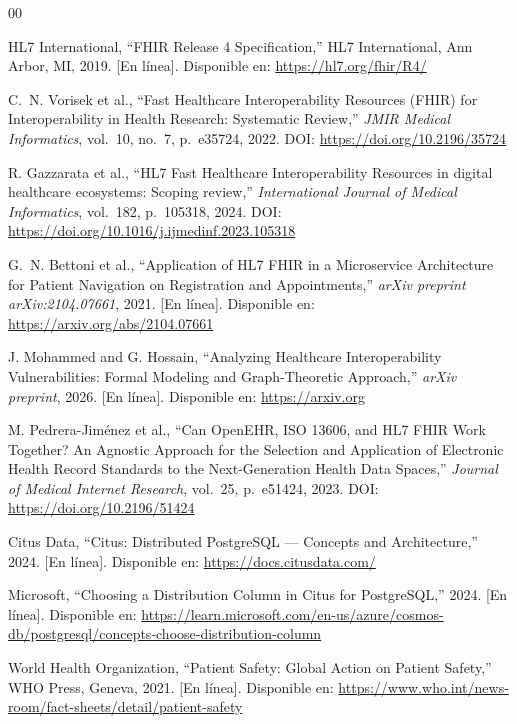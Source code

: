 \documentclass[conference]{IEEEtran}
\begin{document}
\begin{thebibliography}{00}

HL7 International,
``FHIR Release 4 Specification,''
HL7 International, Ann Arbor, MI, 2019.
[En l\'inea]. Disponible en: \url{https://hl7.org/fhir/R4/}

C.~N. Vorisek et al.,
``Fast Healthcare Interoperability Resources (FHIR) for Interoperability
in Health Research: Systematic Review,''
\textit{JMIR Medical Informatics}, vol.~10, no.~7, p.~e35724, 2022.
DOI: \url{https://doi.org/10.2196/35724}

R. Gazzarata et al.,
``HL7 Fast Healthcare Interoperability Resources in digital healthcare
ecosystems: Scoping review,''
\textit{International Journal of Medical Informatics}, vol.~182,
p.~105318, 2024.
DOI: \url{https://doi.org/10.1016/j.ijmedinf.2023.105318}

G.~N. Bettoni et al.,
``Application of HL7 FHIR in a Microservice Architecture for Patient
Navigation on Registration and Appointments,''
\textit{arXiv preprint arXiv:2104.07661}, 2021.
[En l\'inea]. Disponible en: \url{https://arxiv.org/abs/2104.07661}

J. Mohammed and G. Hossain,
``Analyzing Healthcare Interoperability Vulnerabilities: Formal Modeling
and Graph-Theoretic Approach,''
\textit{arXiv preprint}, 2026.
[En l\'inea]. Disponible en: \url{https://arxiv.org}

M. Pedrera-Jim\'enez et al.,
``Can OpenEHR, ISO 13606, and HL7 FHIR Work Together? An Agnostic
Approach for the Selection and Application of Electronic Health Record
Standards to the Next-Generation Health Data Spaces,''
\textit{Journal of Medical Internet Research}, vol.~25, p.~e51424, 2023.
DOI: \url{https://doi.org/10.2196/51424}

Citus Data,
``Citus: Distributed PostgreSQL — Concepts and Architecture,''
2024. [En l\'inea]. Disponible en: \url{https://docs.citusdata.com/}

Microsoft,
``Choosing a Distribution Column in Citus for PostgreSQL,''
2024. [En l\'inea]. Disponible en:
\url{https://learn.microsoft.com/en-us/azure/cosmos-db/postgresql/concepts-choose-distribution-column}

World Health Organization,
``Patient Safety: Global Action on Patient Safety,''
WHO Press, Geneva, 2021.
[En l\'inea]. Disponible en: \url{https://www.who.int/news-room/fact-sheets/detail/patient-safety}


\end{thebibliography}
\end{document}
